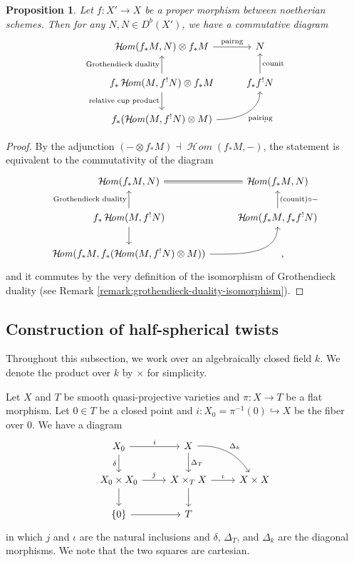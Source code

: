 \documentclass{amsart}
\numberwithin{equation}{section}
\theoremstyle{plain}
\newtheorem{proposition}[theorem]{Proposition}
\theoremstyle{definition}
\DeclareMathOperator{\CHom}{\mathcal{H}\!\mathit{om}}
\begin{document}
\begin{proposition}\label{prop:relative-cup-product-and-Grothendieck-duality}
    Let $f \colon X' \to X$ be a proper morphism between noetherian schemes.
    Then for any $N, N \in D^b(X')$, we have a commutative diagram
    \[
        \begin{tikzcd}
            \CHom(f_*M, N)\otimes f_*M \ar[r, "\text{pairng}"] & N \\
            f_*\CHom(M, f^!N)\otimes f_*M \ar[d, "\text{relative cup product}"']\ar[u, "\text{Grothendieck duality}"]& f_*f^!N \ar[u, "\text{counit}"'] \\
            f_*(\CHom(M, f^!N)\otimes M) \ar[ru, out=0, in=-90, "\text{pairing}"'] & \quad .
        \end{tikzcd}
    \]
\end{proposition}
\begin{proof}
    By the adjunction $(-\otimes f_*M) \dashv \CHom(f_*M, -)$, the statement is equivalent to the commutativity of the diagram
    \[
        \begin{tikzcd}
            \CHom(f_*M, N) \ar[r, equal] & \CHom(f_*M, N)\\
            f_*\CHom(M, f^!N) \ar[u, "\text{Grothendieck duality}"]\ar[d]& \CHom(f_*M, f_*f^!N)\ar[u, "(\text{counit}) \circ -"']\\
            \CHom(f_*M, f_*(\CHom(M, f^!N)\otimes M)) \ar[ru, out=0, in=-90]& \quad,
        \end{tikzcd}
    \]
    and it commutes by the very definition of the isomorphism of Grothendieck duality (see Remark \ref{remark:grothendieck-duality-isomorphism}).
\end{proof}



\subsection{Construction of half-spherical twists}
Throughout this subsection, we work over an algebraically closed field $k$.
We denote the product over $k$ by $\times$ for simplicity.

Let $X$ and $T$ be smooth quasi-projective varieties and $\pi \colon X \to T$ be a flat morphism.
Let $0 \in T$ be a closed point and $i \colon X_0 = \pi^{-1}(0) \hookrightarrow X$ be the fiber over $0$.
We have a diagram
\[
    \begin{tikzcd}
        X_0 \arrow[r,"i"]\arrow[d, "\delta"'] & X \arrow[d,"\Delta_T"]\arrow[rd, bend left, "\Delta_k"]&\\
        X_0 \times X_0 \arrow[r, "j"] \ar[d]& X \times_T X\arrow[r, "\iota"] \ar[d]&X \times X \\
        \{0\} \ar[r] & T &
    \end{tikzcd}
\]
in which $j$ and $\iota$ are the natural inclusions and $\delta$, $\Delta_T$, and $\Delta_k$ are the diagonal morphisms.
We note that the two squares are cartesian.
\end{document}
